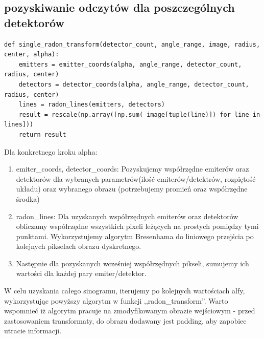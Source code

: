 \documentclass[11pt]{article}
\begin{document}
\subsection{pozyskiwanie odczytów dla poszczególnych detektorów}
\begin{verbatim}
def single_radon_transform(detector_count, angle_range, image, radius, center, alpha):
    emitters = emitter_coords(alpha, angle_range, detector_count, radius, center)
    detectors = detector_coords(alpha, angle_range, detector_count, radius, center)
    lines = radon_lines(emitters, detectors)
    result = rescale(np.array([np.sum( image[tuple(line)]) for line in lines]))
    return result
\end{verbatim}
Dla konkretnego kroku alpha:
\begin{enumerate}
  \item emiter\_coords, detector\_coords: Pozyskujemy współrzędne emiterów oraz detektorów dla wybranych parametrów(ilość emiterów/detektrów, rozpiętość układu) oraz wybranego obrazu (potrzebujemy promień oraz współrzędne środka)
  \item radon\_lines: Dla uzyskanych współrzędnych emiterów oraz detektorów obliczamy współrzędne wszystkich pixeli leżących na prostych pomiędzy tymi punktami. Wykorzystujemy algorytm Bresenhama do liniowego przejścia po kolejnych pikselach obrazu dyskretnego.
  \item Następnie dla pozyskanych wcześniej współrzędnych pikseli, sumujemy ich wartości dla każdej pary emiter/detektor.
\end{enumerate}
W celu uzyskania całego sinogramu, iterujemy po kolejnych wartościach alfy, wykorzystując powyższy algorytm w funkcji ,,radon\_transform''. Warto wspomnieć iż algorytm pracuje na zmodyfikowanym obrazie wejściowym - przed zastosowaniem transformaty, do obrazu dodawany jest padding, aby zapobiec utracie informacji.
\end{document}

